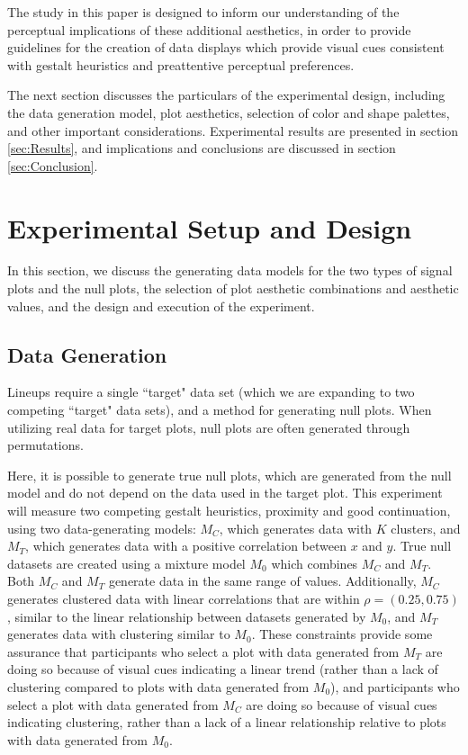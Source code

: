 \documentclass[12pt]{article}\usepackage[]{graphicx}\usepackage[]{color}
\begin{document}
The study in this paper is designed to inform our understanding of the perceptual implications of these additional aesthetics, in order to provide guidelines for the creation of data displays which provide visual cues consistent with gestalt heuristics and preattentive perceptual preferences. 

The next section discusses the particulars of the experimental design, including the data generation model, plot aesthetics, selection of color and shape palettes, and other important considerations. Experimental results are presented in section \ref{sec:Results}, and implications and conclusions are discussed in section \ref{sec:Conclusion}. 

\section{Experimental Setup and Design} \label{sec:ExperimentalDesign}
In this section, we discuss the generating data models for the two types of signal plots and the null plots, the selection of plot aesthetic combinations and aesthetic values, and the design and execution of the experiment.

\subsection{Data Generation}
Lineups require a single ``target" data set (which we are expanding to two competing ``target" data sets), and a method for generating null plots. When utilizing real data for target plots, null plots are often generated through permutations.

Here, it is possible to generate true null plots, which are generated from the null model and do not depend on the data used in the target plot. 
This experiment will measure two competing gestalt heuristics, proximity and good continuation, using two data-generating models: $M_C$, which generates data with $K$ clusters, and $M_T$, which generates data with a positive correlation between $x$ and $y$. 
True null datasets are created using a mixture model $M_0$ which combines $M_C$ and $M_T$. Both $M_C$ and $M_T$ generate data in the same range of values. 
Additionally, $M_C$ generates clustered data with linear correlations that are within $\rho = (0.25, 0.75)$, similar to the linear relationship between datasets generated by $M_0$, and $M_T$ generates data with clustering similar to $M_0$. These constraints provide some assurance that participants who select a plot with data generated from $M_T$ are doing so because of visual cues indicating a linear trend (rather than a lack of clustering compared to plots with data generated from $M_0$), and participants who select a plot with data generated from $M_C$ are doing so because of visual cues indicating clustering, rather than a lack of a linear relationship relative to plots with data generated from $M_0$. 
\end{document}
